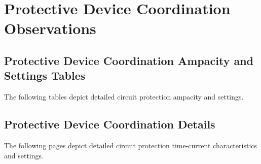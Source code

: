 \section{Protective Device Coordination Observations}
\label{af:pdcobservations}

\subsection{Protective Device Coordination Ampacity and Settings Tables}
\label{af:pdcobservations:Tables}

The following tables depict detailed circuit protection ampacity and settings. 

\pagebreak



\subsection{Protective Device Coordination Details}
\label{af:pdcobservations:TCC}

The following pages depict detailed circuit protection time-current characteristics and settings. 


